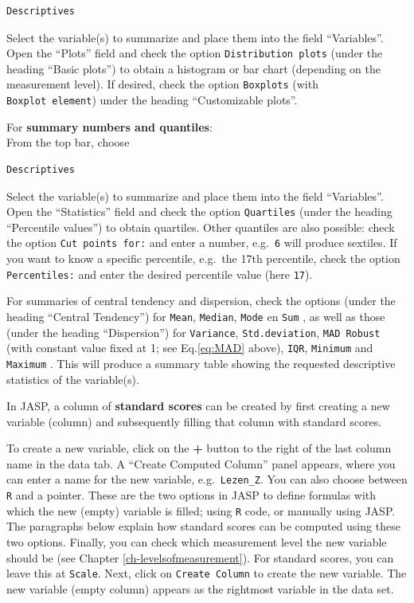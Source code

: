 \documentclass[
]{book}
\begin{document}
\begin{verbatim}
Descriptives
\end{verbatim}

Select the variable(s) to summarize and place them into the field ``Variables''. Open the ``Plots'' field and check the option \texttt{Distribution\ plots} (under the heading ``Basic plots'') to obtain a histogram or bar chart (depending on the measurement level).
If desired, check the option \texttt{Boxplots} (with \texttt{Boxplot\ element}) under the heading ``Customizable plots''.

For \textbf{summary numbers and quantiles}:\\
From the top bar, choose

\begin{verbatim}
Descriptives
\end{verbatim}

Select the variable(s) to summarize and place them into the field ``Variables''. Open the ``Statistics'' field and check the option \texttt{Quartiles} (under the heading ``Percentile values'') to obtain quartiles.
Other quantiles are also possible: check the option \texttt{Cut\ points\ for:} and enter a number, e.g.~\texttt{6} will produce sextiles. If you want to know a specific percentile, e.g.~the 17th percentile, check the option \texttt{Percentiles:} and enter the desired percentile value (here \texttt{17}).

For summaries of central tendency and dispersion, check the options (under the heading ``Central Tendency'') for \texttt{Mean}, \texttt{Median}, \texttt{Mode} en \texttt{Sum} , as well as those (under the heading ``Dispersion'') for \texttt{Variance}, \texttt{Std.deviation}, \texttt{MAD\ Robust} (with constant value fixed at 1; see Eq.\eqref{eq:MAD} above), \texttt{IQR}, \texttt{Minimum} and \texttt{Maximum} . This will produce a summary table showing the requested descriptive statistics of the variable(s).

In JASP, a column of \textbf{standard scores} can be created by first creating a new variable (column) and subsequently filling that column with standard scores.

To create a new variable, click on the \textbf{+} button to the right of the last column name in the data tab. A ``Create Computed Column'' panel appears, where you can enter a name for the new variable, e.g.~\texttt{Lezen\_Z}. You can also choose between \texttt{R} and a pointer. These are the two options in JASP to define formulas with which the new (empty) variable is filled; using \texttt{R} code, or manually using JASP. The paragraphs below explain how standard scores can be computed using these two options. Finally, you can check which measurement level the new variable should be (see Chapter \ref{ch-levelsofmeasurement}). For standard scores, you can leave this at \texttt{Scale}. Next, click on \texttt{Create\ Column} to create the new variable. The new variable (empty column) appears as the rightmost variable in the data set.
\end{document}
